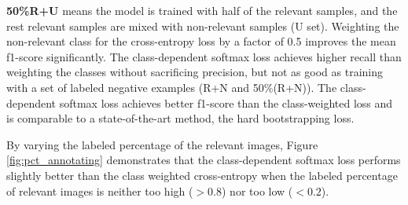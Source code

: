 \begin{table}[t]
{\textbf{50\%R+U} means the model is trained with half of the relevant samples, and the rest relevant samples are mixed with non-relevant samples (U set).
Weighting the non-relevant class for the cross-entropy loss by a factor of 0.5 improves the mean f1-score significantly.
The class-dependent softmax loss achieves higher recall than weighting the classes without sacrificing precision, but not as good as training with a set of labeled negative examples (R+N and 50\%(R+N)).
The class-dependent softmax loss achieves better f1-score than the class-weighted loss and is comparable to a state-of-the-art method, the hard bootstrapping loss.
}
\label{tab:cifar}
\end{table}


By varying the labeled percentage of the relevant images, Figure \ref{fig:pct_annotating} demonstrates that the class-dependent softmax loss performs slightly better than the class weighted cross-entropy when the labeled percentage of relevant images is neither too high ($>0.8$) nor too low ($<0.2$).


